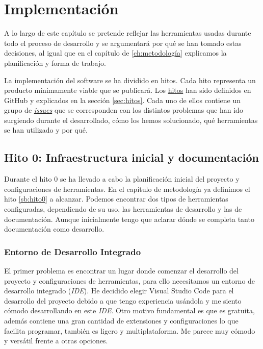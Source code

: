 \UseRawInputEncoding
\chapter{Implementación}

A lo largo de este capítulo se pretende reflejar las herramientas usadas durante todo el proceso de desarrollo y
se argumentará por qué se han tomado estas decisiones, al igual que en el capítulo de \ref{ch:metodología} explicamos
la planificación y forma de trabajo.

La implementación del software se ha dividido en hitos. Cada hito representa un producto mínimamente viable que se publicará.
Los \href{https://github.com/RubenDelgadoPareja/TFG-Triage-Inteligente-Consulta-Medica/milestones}{hitos} han sido definidos en GitHub y explicados en la sección \ref{sec:hitos}.
Cada uno de ellos contiene un grupo de \href{https://github.com/RubenDelgadoPareja/TFG-Triage-Inteligente-Consulta-Medica/issues}{\textit{issues}} que se corresponden
con los distintos problemas que han ido surgiendo durante el desarrollado, cómo los hemos solucionado, qué herramientas se han utilizado y por qué.

\section{Hito 0: Infraestructura inicial y documentación}

Durante el hito 0 se ha llevado a cabo la planificación inicial del proyecto y configuraciones de herramientas. En el capítulo de metodología ya definimos el hito \ref{sb:hito0} a alcanzar.
Podemos encontrar dos tipos de herramientas configuradas, dependiendo de su uso, las herramientas de desarrollo y las de documentación.
Aunque inicialmente tengo que aclarar dónde se completa tanto documentación como desarrollo.

\subsection{Entorno de Desarrollo Integrado}
El primer problema es encontrar un lugar donde comenzar el desarrollo del proyecto y configuraciones de herramientas, para ello necesitamos un entorno de desarrollo integrado (\textit{IDE}).
He decidido elegir Visual Studio Code para el desarrollo del proyecto debido a que tengo experiencia usándola y me siento cómodo desarrollando en este {\textit{IDE}}.
Otro motivo fundamental es que es gratuita, además contiene una gran cantidad de extensiones y configuraciones lo que facilita programar, también es ligero y multiplataforma.
Me parece muy cómodo y versátil frente a otras opciones.


